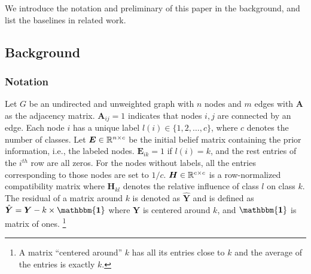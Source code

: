 

We introduce the notation and preliminary of this paper in the background, and list the baselines in related work.

\subsection{Background}
\subsubsection*{Notation}
Let $G$ be an undirected and unweighted graph with $n$ nodes and $m$ edges with ${\boldsymbol A}$ as the adjacency matrix. ${\boldsymbol A}_{ij} = 1$ indicates that nodes $i, j$ are connected by an edge. Each node $i$ has a unique label $l(i) \in \{1, 2, \dots, c\}$, where $c$ denotes the number of classes. Let ${\boldsymbol E} \in \mathbb{R}^{n \times c}$ be the initial belief matrix containing the prior information, i.e., the labeled nodes. 
${\boldsymbol E}_{ik} = 1$ if $l(i) = k$,
and the rest entries of the $i^{th}$ row are all zeros. 
For the nodes without labels, all the entries corresponding to those nodes are set to $1 / c$. ${\boldsymbol H} \in \mathbb{R}^{c \times c}$ is a row-normalized compatibility matrix where ${\boldsymbol H}_{kl}$ denotes the relative influence of class $l$ on class $k$.
The residual of a matrix around $k$ is denoted as $\hat{{\boldsymbol Y}}$ and is defined as $\hat{{\boldsymbol Y}} = {\boldsymbol Y} - k\times\mathbbm{{\boldsymbol 1}}$ where ${\boldsymbol Y}$ is centered around $k$, and $\mathbbm{{\boldsymbol 1}}$ is matrix of ones.
\footnote{A matrix ``centered around'' $k$ has all its entries close to $k$ and the average of the entries is exactly $k$.}

